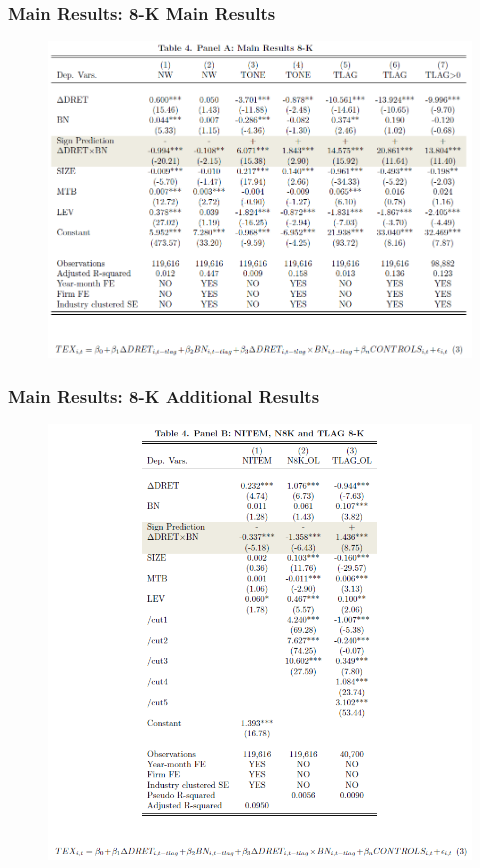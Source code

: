 \documentclass{beamer}
\begin{document}
\begin{frame}
\frametitle{Main Results: 8-K Main Results}
	\begin{figure}[h]
	\centering
	\includegraphics[width=0.75\linewidth]{tab4panA}
	\label{tab4panA}
	\end{figure}
\end{frame}
\begin{frame}
\frametitle{Main Results: 8-K Additional Results}
	\begin{figure}[h]
	\centering
	\includegraphics[width=0.62\linewidth]{tab4panB}
	\label{tab4panB}
	\end{figure}
\end{frame}
\end{document}
